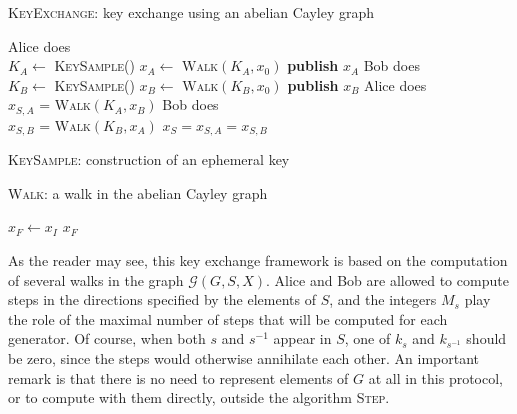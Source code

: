 \documentclass{article}
\newcommand{\Graph}{\mathcal{G}}
\newcommand{\algstyle}[1]{\textsc{#1}}
\theoremstyle{definition}
\begin{document}
\begin{algorithm}
    \caption{\algstyle{KeyExchange}: key exchange using an abelian Cayley graph}
    \label{alg:keyex}
    Alice does\\
			\quad $K_A \gets$ \algstyle{KeySample}()\;
			\quad $x_A \gets$ \algstyle{Walk}$(K_A, x_0)$\;
			\quad \textbf{publish} $x_A$ \;
		Bob does\\
			\quad $K_B \gets$ \algstyle{KeySample}()\;
			\quad $x_B \gets$ \algstyle{Walk}$(K_B, x_0)$\;
			\quad \textbf{publish} $x_B$ \;
		Alice does\\
			\quad $x_{S, A}$ = \algstyle{Walk}$(K_A, x_B)$\;
		Bob does\\
			\quad $x_{S, B}$ = \algstyle{Walk}$(K_B, x_A)$\;
		\Return $x_S = x_{S, A} = x_{S, B}$
\end{algorithm}

\begin{algorithm}
	\caption{\algstyle{KeySample}: construction of an ephemeral key}
	\label{alg:key}
\end{algorithm}

\begin{algorithm}
	\caption{\algstyle{Walk}: a walk in the abelian Cayley graph}
	\label{alg:walk}
	$x_F\gets x_I$\;
	\For{$s\in S$}{
		\lFor{\(0 \le i < k_s\)}{
			$x_F\gets$ \algstyle{Step}$(s, x_F)$
		}
	}
	\Return $x_F$
\end{algorithm}

As the reader may see, this key exchange framework is based on the computation
of several walks in the graph $\Graph(G, S, X)$. Alice and Bob are allowed to
compute steps in the directions specified by the elements of $S$, and the integers
$M_s$ play the role of the maximal number of steps that will be computed
for each generator. Of course, when both $s$ and $s^{-1}$ appear in $S$, one
of $k_s$ and $k_{s^{-1}}$ should be zero, since the steps would otherwise
annihilate each other.
An important remark is that there is no need to represent
elements of $G$ at all in this protocol, or to compute with them directly,
outside the algorithm \algstyle{Step}.
\end{document}
